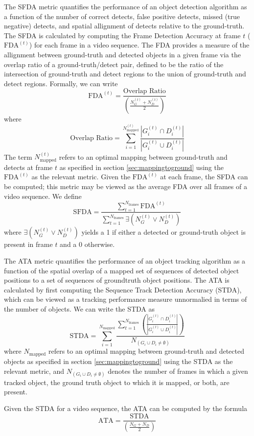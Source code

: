 \documentclass{article}
\begin{document}
The SFDA metric quantifies the performance of an object detection algorithm as a function of the number of correct detects, false positive detects, missed (true negative) detects, and spatial allignment of detects relative to the ground-truth. The SFDA is calculated by computing the Frame Detection Accuracy at frame $t$ ($\text{FDA}^{(t)}$) for each frame in a video sequence. The FDA provides a measure of the allignment between ground-truth and detected objects in a given frame via the overlap ratio of a ground-truth/detect pair, defined to be the ratio of the intersection of ground-truth and detect regions to the union of ground-truth and detect regions. Formally, we can write
\begin{equation}
\text{FDA}^{(t)} = \frac{\text{Overlap Ratio}}{\left(\frac{N_{G}^{(t)} + N_{D}^{(t)}}{2}\right)}
\end{equation}
where
\begin{equation}
\text{Overlap Ratio} = \sum_{i = 1}^{N_{\text{mapped}}^{(t)}} \frac{\left|G_{i}^{(t)} \cap D_{i}^{(t)}\right|}{\left|G_{i}^{(t)} \cup D_{i}^{(t)}\right|}
\end{equation}
The term $N_{\text{mapped}}^{(t)}$ refers to an optimal mapping between ground-truth and detects at frame $t$ as specified in section \ref{sec:mappingtoground} using the $\text{FDA}^{(t)}$ as the relevant metric. Given the $\text{FDA}^{(t)}$ at each frame, the SFDA can be computed; this metric may be viewed as the average FDA over all frames of a video sequence. We define
\begin{equation}
\text{SFDA} = \frac{\sum_{t=1}^{N_{\text{frames}}} \text{FDA}^{(t)}}{\sum_{t=1}^{N_{\text{frames}}} \exists \left( N_{G}^{(t)} \vee N_{D}^{(t)} \right)}
\end{equation}
where $\exists \left( N_{G}^{(t)} \vee N_{D}^{(t)} \right)$ yields a 1 if either a detected or ground-truth object is present in frame $t$ and a 0 otherwise.

The ATA metric quantifies the performance of an object tracking algorithm as a function of the spatial overlap of a mapped set of sequences of detected object positions to a set of sequences of groundtruth object positions. The ATA is calculated by first computing the Sequence Track Detection Accuracy (STDA), which can be viewed as a tracking performance measure unnormalied in terms of the number of objects. We can write the STDA as
\begin{equation}
\text{STDA} = \sum_{i=1}^{N_{\text{mapped}}} \frac{\sum_{t=1}^{N_{\text{frames}}} \left( \frac{\left|G_{i}^{(t)} \cap D_{i}^{(t)}\right|}{\left|G_{i}^{(t)} \cup D_{i}^{(t)}\right|}  \right) }{ N_{(G_{i} \cup D_{i} \neq \emptyset)} }
\end{equation}
where $N_{\text{mapped}}$ refers to an optimal mapping between ground-truth and detected objects as specified in section \ref{sec:mappingtoground} using the STDA as the relevant metric, and $N_{(G_{i} \cup D_{i} \neq \emptyset)}$ denotes the number of frames in which a given tracked object, the ground truth object to which it is mapped, or both, are present.

Given the STDA for a video sequence, the ATA can be computed by the formula
\begin{equation}
\text{ATA} = \frac{\text{STDA}}{\left( \frac{N_{G} + N_{D}}{2} \right)}
\end{equation}
\end{document}
